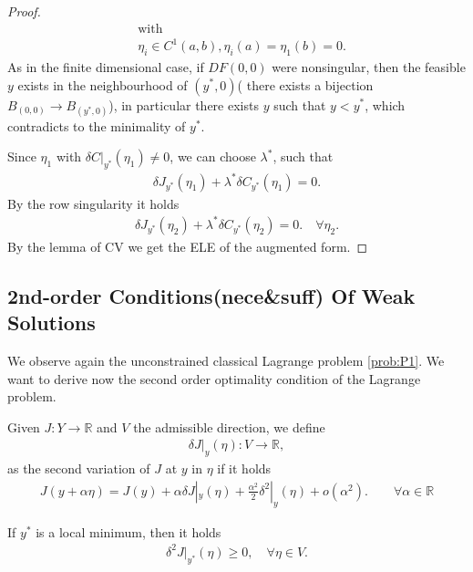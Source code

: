 \begin{proof}
\begin{align*}
		&\text{with}\\
		& \eta_i \in C^1(a, b), \eta_i(a) = \eta_1(b) = 0.   
	\end{align*} 
		As in the finite dimensional case, if $DF(0, 0)$ were nonsingular, then the feasible $y$ exists in the neighbourhood of $(y^*, 0)$( there exists a bijection $B_{(0, 0)} \rightarrow B_{(y^*, 0)}$), in particular there exists $y$ such that $y < y^*$, which contradicts to the minimality of $y^*$.\par 
		Since $\eta_1$ with $\delta C|_{y^*}(\eta_1) \neq 0$, we can choose $\lambda^*$, such that
	\begin{align*}
		\delta J_{y^*}(\eta_1) + \lambda^* \delta C_{y^*}(\eta_1) = 0. 
	\end{align*}
	By the row singularity it holds
	\begin{align*}
		\delta J_{y^*}(\eta_2) + \lambda^* \delta C_{y^*}(\eta_2) = 0. \quad \forall \eta_2. 
	\end{align*}
	By the lemma of CV we get the ELE of the augmented form.
\end{proof}

\subsection{2nd-order Conditions(nece\&suff) Of Weak Solutions}
We observe again the unconstrained classical Lagrange problem \eqref{prob:P1}. We want to derive now the second order optimality condition of the Lagrange problem.

\begin{definition}
Given $J: Y \rightarrow \mathbb{R}$ and $V$ the admissible direction, we define 
\begin{align*}
	\delta J|_y(\eta): V \rightarrow \mathbb{R}, 
\end{align*}
	as the second variation of $J$ at $y$ in $\eta$ if it holds
	\begin{align*}
		J(y + \alpha \eta) = J(y) + \alpha \delta J|_y(\eta) + \frac{\alpha^2}{2}\delta^2|_y(\eta) + o(\alpha^2). \qquad \forall \alpha \in \mathbb{R}
	\end{align*}
\end{definition}

\begin{proposition}
	If $y^*$ is a local minimum, then it holds
	\begin{align*}
		\delta^2 J|_{y^*} (\eta) \ge 0, \quad \forall \eta \in V. 
	\end{align*}
\end{proposition}



